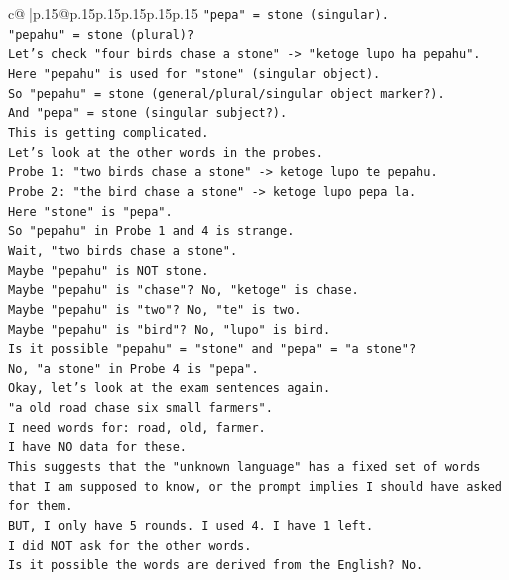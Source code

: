 \documentclass{article}
\begin{document}
{\begin{supertabular}{c@{$\;$}|p{.15\linewidth}@{}p{.15\linewidth}p{.15\linewidth}p{.15\linewidth}p{.15\linewidth}p{.15\linewidth}}
{{{\texttt{"pepa" = stone (singular).} \\
\texttt{"pepahu" = stone (plural)?} \\
\texttt{Let's check "four birds chase a stone" {-}> "ketoge lupo ha pepahu".} \\
\texttt{Here "pepahu" is used for "stone" (singular object).} \\
\texttt{So "pepahu" = stone (general/plural/singular object marker?).} \\
\texttt{And "pepa" = stone (singular subject?).} \\
\texttt{This is getting complicated.} \\
\texttt{Let's look at the other words in the probes.} \\
\texttt{Probe 1: "two birds chase a stone" {-}> ketoge lupo te pepahu.} \\
\texttt{Probe 2: "the bird chase a stone" {-}> ketoge lupo pepa la.} \\
\texttt{Here "stone" is "pepa".} \\
\texttt{So "pepahu" in Probe 1 and 4 is strange.} \\
\texttt{Wait, "two birds chase a stone".} \\
\texttt{Maybe "pepahu" is NOT stone.} \\
\texttt{Maybe "pepahu" is "chase"? No, "ketoge" is chase.} \\
\texttt{Maybe "pepahu" is "two"? No, "te" is two.} \\
\texttt{Maybe "pepahu" is "bird"? No, "lupo" is bird.} \\
\texttt{Is it possible "pepahu" = "stone" and "pepa" = "a stone"?} \\
\texttt{No, "a stone" in Probe 4 is "pepa".} \\
\texttt{Okay, let's look at the exam sentences again.} \\
\texttt{"a old road chase six small farmers".} \\
\texttt{I need words for: road, old, farmer.} \\
\texttt{I have NO data for these.} \\
\texttt{This suggests that the "unknown language" has a fixed set of words that I am supposed to know, or the prompt implies I should have asked for them.} \\
\texttt{BUT, I only have 5 rounds. I used 4. I have 1 left.} \\
\texttt{I did NOT ask for the other words.} \\
\texttt{Is it possible the words are derived from the English? No.} \\
}}}
\end{supertabular}}
\end{document}
